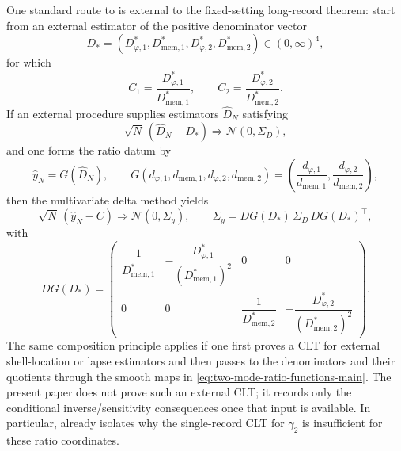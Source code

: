 \begin{remark}\label{rem:ratio-data-delta-source-main}
One standard route to  is external to the
fixed-setting long-record theorem: start from an
external estimator of the positive denominator vector
\[
D_*=(D_{\varphi,1}^*,D_{{\mathrm{mem}},1}^*,D_{\varphi,2}^*,D_{{\mathrm{mem}},2}^*)
\in(0,\infty)^4,
\]
for which
\[
C_1=\frac{D_{\varphi,1}^*}{D_{{\mathrm{mem}},1}^*},
\qquad
C_2=\frac{D_{\varphi,2}^*}{D_{{\mathrm{mem}},2}^*}.
\]
If an external procedure supplies estimators $\widehat D_N$ satisfying
\[
\sqrt{N}\,(\widehat D_N-D_*)\Longrightarrow\mathcal N(0,\Sigma_D),
\]
and one forms the ratio datum by
\[
\widehat y_N=G(\widehat D_N),\qquad
G(d_{\varphi,1},d_{{\mathrm{mem}},1},d_{\varphi,2},d_{{\mathrm{mem}},2})
=\left(\frac{d_{\varphi,1}}{d_{{\mathrm{mem}},1}},
\frac{d_{\varphi,2}}{d_{{\mathrm{mem}},2}}\right),
\]
then the multivariate delta method yields
\[
\sqrt{N}\,(\widehat y_N-C)\Longrightarrow \mathcal N(0,\Sigma_y),
\qquad
\Sigma_y=DG(D_*)\,\Sigma_D\,DG(D_*)^\top,
\]
with
\[
DG(D_*)=
\begin{pmatrix}
\dfrac{1}{D_{{\mathrm{mem}},1}^*}
&
-\dfrac{D_{\varphi,1}^*}{(D_{{\mathrm{mem}},1}^*)^2}
& 0 & 0\\[1.1ex]
0 & 0 &
\dfrac{1}{D_{{\mathrm{mem}},2}^*}
&
-\dfrac{D_{\varphi,2}^*}{(D_{{\mathrm{mem}},2}^*)^2}
\end{pmatrix}.
\]
The same composition principle applies if one first proves a CLT for external
shell-location or lapse estimators and then passes to the denominators and
their quotients through the smooth maps in
\eqref{eq:two-mode-ratio-functions-main}. The present paper does not prove such
an external CLT; it records only the conditional inverse/sensitivity consequences once
that input is available. In particular,
 already isolates why the single-record CLT
for $\gamma_2$ is insufficient for these ratio coordinates.
\end{remark}

